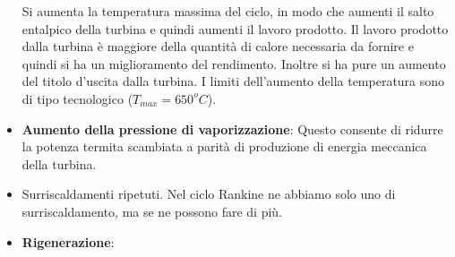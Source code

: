 \begin{itemize}
\begin{center}
    \end{center}
    Si aumenta la temperatura massima del ciclo, in modo che aumenti il salto entalpico della turbina e quindi aumenti il lavoro prodotto. Il lavoro prodotto dalla turbina è maggiore della quantità di calore necessaria da fornire e quindi si ha un miglioramento del rendimento.\newline
    \newline
    Inoltre si ha pure un aumento del titolo d'uscita dalla turbina. \newline
    \newline
    I limiti dell'aumento della temperatura sono di tipo tecnologico ($T_{max} = 650^o C$).
    \item \textbf{ Aumento della pressione di vaporizzazione}:\newline
    Questo consente di ridurre la potenza termita scambiata a parità di produzione di energia meccanica della turbina.
    \item Surriscaldamenti ripetuti.\newline
    Nel ciclo Rankine ne abbiamo solo uno di surriscaldamento, ma se ne possono fare di più.
    \item \textbf{Rigenerazione}:\newline
\end{itemize}